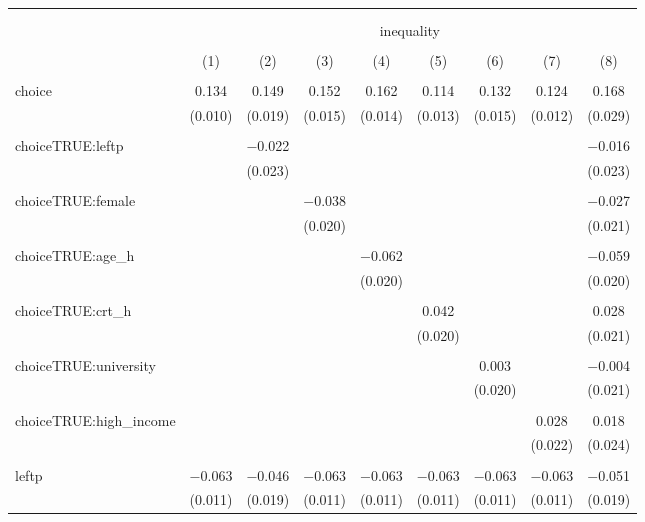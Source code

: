 
\begin{table}[!htbp] \centering 
  \caption{} 
  \label{} 
\begin{tabular}{@{\extracolsep{5pt}}lcccccccc} 
\\[-1.8ex]\hline 
\hline \\[-1.8ex] 
\\[-1.8ex] & \multicolumn{8}{c}{inequality} \\ 
\\[-1.8ex] & (1) & (2) & (3) & (4) & (5) & (6) & (7) & (8)\\ 
\hline \\[-1.8ex] 
 choice & 0.134 & 0.149 & 0.152 & 0.162 & 0.114 & 0.132 & 0.124 & 0.168 \\ 
  & (0.010) & (0.019) & (0.015) & (0.014) & (0.013) & (0.015) & (0.012) & (0.029) \\ 
  & & & & & & & & \\ 
 choiceTRUE:leftp &  & $-$0.022 &  &  &  &  &  & $-$0.016 \\ 
  &  & (0.023) &  &  &  &  &  & (0.023) \\ 
  & & & & & & & & \\ 
 choiceTRUE:female &  &  & $-$0.038 &  &  &  &  & $-$0.027 \\ 
  &  &  & (0.020) &  &  &  &  & (0.021) \\ 
  & & & & & & & & \\ 
 choiceTRUE:age\_h &  &  &  & $-$0.062 &  &  &  & $-$0.059 \\ 
  &  &  &  & (0.020) &  &  &  & (0.020) \\ 
  & & & & & & & & \\ 
 choiceTRUE:crt\_h &  &  &  &  & 0.042 &  &  & 0.028 \\ 
  &  &  &  &  & (0.020) &  &  & (0.021) \\ 
  & & & & & & & & \\ 
 choiceTRUE:university &  &  &  &  &  & 0.003 &  & $-$0.004 \\ 
  &  &  &  &  &  & (0.020) &  & (0.021) \\ 
  & & & & & & & & \\ 
 choiceTRUE:high\_income &  &  &  &  &  &  & 0.028 & 0.018 \\ 
  &  &  &  &  &  &  & (0.022) & (0.024) \\ 
  & & & & & & & & \\ 
 leftp & $-$0.063 & $-$0.046 & $-$0.063 & $-$0.063 & $-$0.063 & $-$0.063 & $-$0.063 & $-$0.051 \\ 
  & (0.011) & (0.019) & (0.011) & (0.011) & (0.011) & (0.011) & (0.011) & (0.019) \\ 

\end{tabular}
\end{table}
